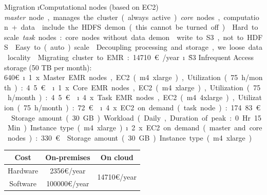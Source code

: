 \begin{frame}{Migration}
\i Computational nodes (based on EC2)
\si \textit{master} node, manages the cluster (always active)
\si \textit{core} nodes, computation + data
\ssi include the HDFS demon (this cannot be turned off)
\ssi Hard to scale
\si \textit{task} nodes: core nodes without data demon
\ssi write to S3, not to HDFS
\ssi Easy to (auto)scale 
\ssi Decoupling processing and storage, we loose data locality
 
\framebreak


Migrating cluster to EMR: 14710\euro{}/year
\i \r{S3 Infrequent Access storage (50 TB per month): 640\euro{}}
\i 1 x Master EMR nodes, EC2 (m4.xlarge), Utilization (75 h/month): 4.5\euro{}
\i 1 x Core EMR nodes, EC2 (m4.xlarge), Utilization (75 h/month): 4.5\euro{}
\i 4 x Task EMR nodes, EC2 (m4.4xlarge), Utilization (75 h/month): 72\euro{}
\i 4 x EC2 on demand (task node): 174.83\euro{}
\si Storage amount (30 GB)
\si Workload (Daily, Duration of peak: 0 Hr 15 Min)
\si Instance type (m4.xlarge)
\i 2 x EC2 on demand (master and core nodes): 330\euro{}
\si Storage amount (30 GB)
\si Instance type (m4.xlarge)

\begin{table}[h!]
    \centering
    \footnotesize
    \begin{tabular}{ccc}
        Cost     &  On-premises       & On cloud                           \\\hline
        Hardware &  2356\euro{}/year  & \multirow{2}{*}{14710\euro{}/year} \\
        Software & 100000\euro{}/year &                                    \\
    \end{tabular}
\end{table}


\end{frame}
